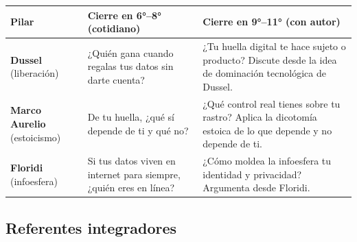 \documentclass[12pt, a4paper]{article}
\begin{document}
\begin{center}
\begin{tabular}{|L{2.6cm}|L{5.5cm}|L{5.5cm}|}
\hline
{}
\color{white}\textbf{Pilar} &
\color{white}\textbf{Cierre en 6°–8° (cotidiano)} &
\color{white}\textbf{Cierre en 9°–11° (con autor)} \\
\hline
\textbf{Dussel} (liberación) &
¿Quién gana cuando regalas tus datos sin darte cuenta? &
¿Tu huella digital te hace sujeto o producto? Discute desde la idea de dominación
tecnológica de Dussel. \\
\hline
\textbf{Marco Aurelio} (estoicismo) &
De tu huella, ¿qué sí depende de ti y qué no? &
¿Qué control real tienes sobre tu rastro? Aplica la dicotomía estoica de lo que
depende y no depende de ti. \\
\hline
\textbf{Floridi} (infoesfera) &
Si tus datos viven en internet para siempre, ¿quién eres en línea? &
¿Cómo moldea la infoesfera tu identidad y privacidad? Argumenta desde Floridi. \\
\hline
\end{tabular}
\end{center}

\subsection{Referentes integradores}
\end{document}
